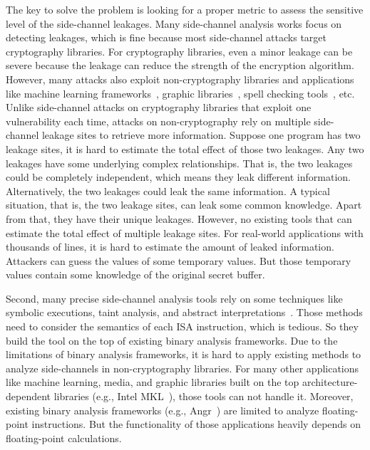 The key to solve the problem is looking for a proper metric to assess the sensitive level of the side-channel leakages. Many side-channel analysis works focus on detecting leakages, which is fine because most side-channel attacks target cryptography libraries. For cryptography libraries, even a minor leakage can be severe because the leakage can reduce the strength of the encryption algorithm. However, many attacks also exploit non-cryptography libraries and applications like machine learning frameworks~\cite{yan2020cache,hong2018security}, graphic libraries~\cite{wang2019unveiling}, spell checking tools~\cite{xu2015controlled}, etc. Unlike side-channel attacks on cryptography libraries that exploit one vulnerability each time, attacks on non-cryptography rely on multiple side-channel leakage sites to retrieve more information. Suppose one program has two leakage sites, it is hard to estimate the total effect of those two leakages. Any two leakages have some underlying complex relationships. That is, the two leakages could be completely independent, which means they leak different information. Alternatively, the two leakages could leak the same information. A typical situation, that is, the two leakage sites, can leak some common knowledge. Apart from that, they have their unique leakages. However, no existing tools that can estimate the total effect of multiple leakage sites. For real-world applications with thousands of lines, it is hard to estimate the amount of leaked information. Attackers can guess the values of some temporary values. But those temporary values contain some knowledge of the original secret buffer. 

Second, many precise side-channel analysis tools rely on some techniques like symbolic executions, taint analysis, and abstract interpretations~\cite{wang2017cached,doychev2015cacheaudit,brotzman2019casym,wang2019identifying}. Those methods need to consider the semantics of each ISA instruction, which is tedious. So they build the tool on the top of existing binary analysis frameworks. Due to the limitations of binary analysis frameworks, it is hard to apply existing methods to analyze side-channels in non-cryptography libraries. For many other applications like machine learning, media, and graphic libraries built on the top architecture-dependent libraries (e.g., Intel MKL~\cite{wang2014intel}), those tools can not handle it. Moreover, existing binary analysis frameworks (e.g., Angr~\cite{shoshitaishvili2016state}) are limited to analyze floating-point instructions. But the functionality of those applications heavily depends on floating-point calculations.

